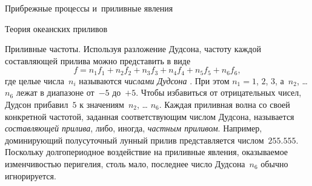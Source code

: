 \begin{chapter}{Прибрежные процессы и~приливные явления}
\begin{section}{Теория океанских приливов}
\begin{paragraph}{Приливные частоты.}
Используя разложение Дудсона, частоту каждой составляющей прилива можно
представить в виде
\begin{equation}
  f = n_1 f_1 + n_2 f_2 + n_3 f_3 + n_4 f_4 + n_5 f_5 + n_6 f_6,
\end{equation}
где целые числа~$n_i$ называются \emph{числами Дудсона}%
. 
При этом $n_1 = 1$, $2$, $3$, а~$n_2$, \dots{} $n_6$ лежат в диапазоне 
от~$-5$ до~$+5$. Чтобы избавиться от отрицательных чисел, Дудсон
прибавил~$5$ к значениям~$n_2$, \dots{} $n_6$.
Каждая приливная волна со своей конкретной частотой, заданная соответствующим 
числом Дудсона, называется 
\emph{составляющей прилива}, 
либо, иногда, \emph{частным приливом}. 
Например, доминирующий полусуточный лунный прилив представляется 
числом~$255.555$. Поскольку долгопериодное воздействие на приливные 
явления, оказываемое изменчивостью перигелия, столь мало, последнее
число Дудсона~$n_6$ обычно игнорируется.
%


\end{paragraph}
\end{section}
\end{chapter}
